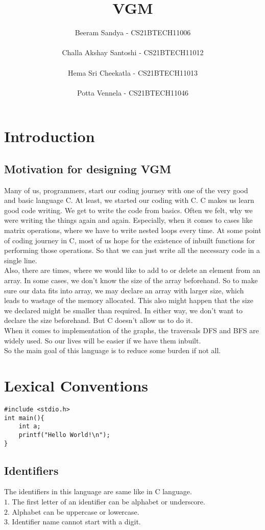\documentclass[journal, 18pt]{report}
\title{ \textbf{VGM}}
\author{Beeram Sandya - CS21BTECH11006\\\\Challa Akshay Santoshi - CS21BTECH11012\\\\Hema Sri Cheekatla - CS21BTECH11013\\\\Potta Vennela - CS21BTECH11046}
\begin{document}
\maketitle

\chapter{Introduction}
\section*{Motivation for designing \textbf{VGM}}
Many of us, programmers, start our coding journey with one of the very good and basic language C. At least, we started our coding with C. C makes us learn good code writing. We get to write the code from basics. Often we felt, why we were writing the things again and again. Especially, when it comes to cases like matrix operations, where we have to write nested loops every time. At some point of coding journey in C, most of us hope for the existence of inbuilt functions for performing those operations. So that we can just write all the necessary code in a single line. \\
Also, there are times, where we would like to add to or delete an element from an array. In some cases, we don't know the size of the array beforehand. So to make sure our data fits into array, we may declare an array with larger size, which leads to wastage of the memory allocated. This also might happen that the size we declared might be smaller than required. In either way, we don't want to declare the size beforehand. But C doesn't allow us to do it.\\
When it comes to implementation of the graphs, the traversals DFS and BFS are widely used. So our lives will be easier if we have them inbuilt.\\
So the main goal of this language is to reduce some burden if not all.
\chapter{Lexical Conventions}
\begin{lstlisting}
#include <stdio.h>
int main(){
    int a;
    printf("Hello World!\n");
}
\end{lstlisting}
\section{Identifiers}
 The identifiers in this language are same like in C language.\\
 $1$. The first letter of an identifier can be alphabet or underscore.\\
 $2$. Alphabet can be uppercase or lowercase.\\
 $3$. Identifier name cannot start with a digit.\\
\end{document}
